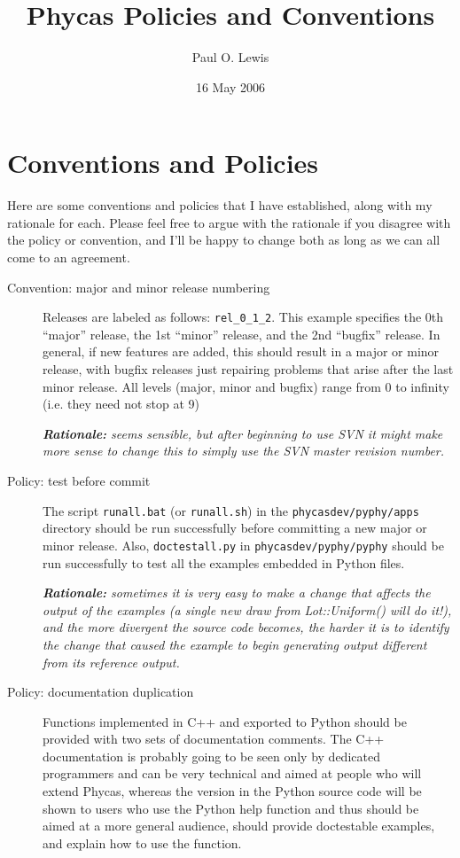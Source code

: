 \documentclass[10pt]{article}
\begin{document}
\title{Phycas Policies and Conventions}
\author{Paul O. Lewis} 
\date{16 May 2006}
\maketitle

\section{Conventions and Policies}

Here are some conventions and policies that I have established, along with my rationale for each. Please feel free to argue with the rationale if you disagree with the policy or convention, and I'll be happy to change both as long as we can all come to an agreement.

\begin{description}
\item[Convention: major and minor release numbering] Releases are labeled as follows: {\tt rel\_0\_1\_2}. This example specifies the 0th ``major'' release, the 1st ``minor'' release, and the 2nd ``bugfix'' release. In general, if new features are added, this should result in a major or minor release, with bugfix releases just repairing problems that arise after the last minor release. All levels (major, minor and bugfix) range from 0 to infinity (i.e. they need not stop at 9) 

{\em {\bfseries Rationale:} seems sensible, but after beginning to use SVN it might make more sense to change this to simply use the SVN master revision number.}

\item[Policy: test before commit] The script {\tt runall.bat} (or {\tt runall.sh}) in the {\tt phycasdev/pyphy/apps} directory should be run successfully before committing a new major or minor release. Also, {\tt doctestall.py} in {\tt phycasdev/pyphy/pyphy} should be run successfully to test all the examples embedded in Python files. 

{\em {\bfseries Rationale:} sometimes it is very easy to make a change that affects the output of the examples (a single new draw from Lot::Uniform() will do it!), and the more divergent the source code becomes, the harder it is to identify the change that caused the example to begin generating output different from its reference output.}

\item[Policy: documentation duplication] Functions implemented in C++ and exported to Python should be provided with two sets of documentation comments. The C++ documentation is probably going to be seen only by dedicated programmers and can be very technical and aimed at people who will extend Phycas, whereas the version in the Python source code will be shown to users who use the Python help function and thus should be aimed at a more general audience, should provide doctestable examples, and explain how to use the function. 


\end{description}
\end{document}
